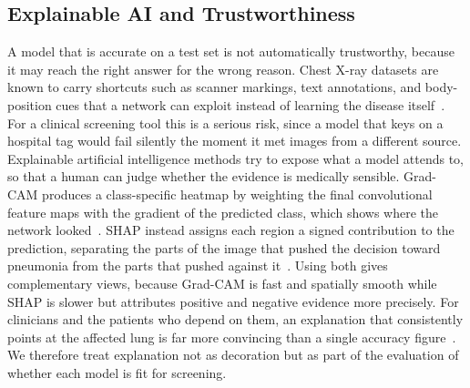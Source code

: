 \documentclass[preprint,12pt]{elsarticle}
\begin{document}
\subsection{Explainable AI and Trustworthiness}
A model that is accurate on a test set is not automatically trustworthy, because it may reach the right answer for the wrong reason.
Chest X-ray datasets are known to carry shortcuts such as scanner markings, text annotations, and body-position cues that a network can exploit instead of learning the disease itself~\cite{nillmani2022segmentation}.
For a clinical screening tool this is a serious risk, since a model that keys on a hospital tag would fail silently the moment it met images from a different source.
Explainable artificial intelligence methods try to expose what a model attends to, so that a human can judge whether the evidence is medically sensible.
Grad-CAM produces a class-specific heatmap by weighting the final convolutional feature maps with the gradient of the predicted class, which shows where the network looked~\cite{selvaraju2017gradcam}.
SHAP instead assigns each region a signed contribution to the prediction, separating the parts of the image that pushed the decision toward pneumonia from the parts that pushed against it~\cite{lundberg2017unified}.
Using both gives complementary views, because Grad-CAM is fast and spatially smooth while SHAP is slower but attributes positive and negative evidence more precisely.
For clinicians and the patients who depend on them, an explanation that consistently points at the affected lung is far more convincing than a single accuracy figure~\cite{bhatia2024evaluating}.
We therefore treat explanation not as decoration but as part of the evaluation of whether each model is fit for screening.
\end{document}
